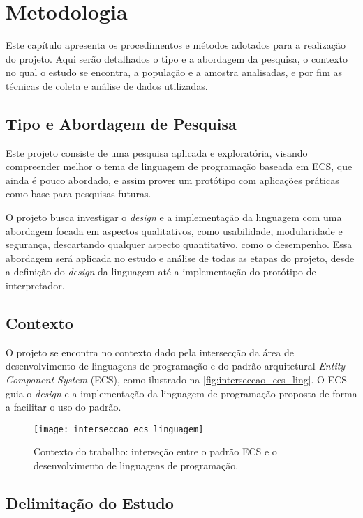 \chapter{Metodologia}\label{ch:metodologia}

Este capítulo apresenta os procedimentos e métodos adotados para a realização do projeto. Aqui serão detalhados o tipo e a abordagem da pesquisa, o contexto no qual o estudo se encontra, a população e a amostra analisadas, e por fim as técnicas de coleta e análise de dados utilizadas.

\section{Tipo e Abordagem de Pesquisa}

Este projeto consiste de uma pesquisa aplicada e exploratória, visando compreender melhor o tema de linguagem de programação baseada em ECS, que ainda é pouco abordado, e assim prover um protótipo com aplicações práticas como base para pesquisas futuras.

O projeto busca investigar o \textit{design} e a implementação da linguagem com uma abordagem focada em aspectos qualitativos, como usabilidade, modularidade e segurança, descartando qualquer aspecto quantitativo, como o desempenho. Essa abordagem será aplicada no estudo e análise de todas as etapas do projeto, desde a definição do \textit{design} da linguagem até a implementação do protótipo de interpretador.

\section{Contexto}

O projeto se encontra no contexto dado pela intersecção da área de desenvolvimento de linguagens de programação e do padrão arquitetural \textit{Entity Component System} (ECS), como ilustrado na \autoref{fig:interseccao_ecs_ling}. O ECS guia o \textit{design} e a implementação da linguagem de programação proposta de forma a facilitar o uso do padrão.

\begin{figure}[H]
	\centering
	\texttt{[image: interseccao\_ecs\_linguagem]}
	\caption{Contexto do trabalho: interseção entre o padrão ECS e o desenvolvimento de linguagens de programação.}
	\label{fig:interseccao_ecs_ling}
\end{figure}

\section{Delimitação do Estudo}

